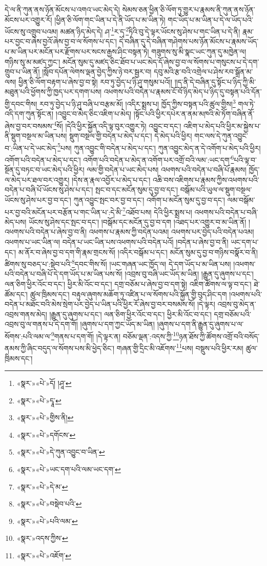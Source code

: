 དེ་ལ་ནི་ཀུན་ནས་ཉོན་མོངས་པ་འགའ་ཡང་མེད་དེ། སེམས་ཅན་ཕྱིན་ཅི་ལོག་ཏུ་གྱུར་པ་རྣམས་ནི་ཀུན་ནས་ཉོན་མོངས་པར་འགྱུར་རོ། །ཕྱིན་ཅི་ལོག་གང་ཡིན་པ་དེ་ནི་ཡོད་པ་མ་ཡིན་ཏེ། གང་ཡོད་པ་མ་ཡིན་པ་དེ་ལ་ཡོད་པའི་ཡོངས་སུ་འགྲུབ་པའམ། མཚན་ཉིད་མེད་དེ། ཤ་\footnote{«སྣར་»«པེ་»དོ། །ཤཱ་}ར་དྭ་\footnote{«སྣར་»«པེ་»དྭཱ་}ཏིའི་བུ་དེ་ལྟར་ཡོངས་སུ་ཤེས་པ་གང་ཡིན་པ་དེ་ནི། རྣམ་པར་བྱང་བ་ཞེས་བྱའོ་ཞེས་བྱ་བ་ལ་སོགས་པ་དང་། དེ་བཞིན་དུ་དེ་བཞིན་གཤེགས་པས་ཉོན་མོངས་པ་རྣམས་ཡོད་པ་མ་ཡིན་པར་མངོན་པར་རྫོགས་པར་སངས་རྒྱས་ཤིང་བསྟན་ཏེ། གཟུགས་སུ་མི་སྣང་ཡང་ཀུན་དུ་མཁྱེན་ལ། གཉིས་སུ་མ་མཛད་ཀྱང་། མངོན་སུམ་དུ་མཛད་ཅིང་ཐོབ་པ་ཡང་མེད་དོ་ཞེས་བྱ་བ་ལ་སོགས་པ་གསུངས་པ་དེ་དག་གྲུབ་པ་ཡིན་ནོ། །སློབ་དཔོན་ལེགས་ལྡན་བྱེད་ཀྱིས་ཉེ་བར་སྦྱར་བ། དབུ་མའི་རྩ་བའི་འགྲེལ་པ་ཤེས་རབ་སྒྲོན་མ་ལས། ཕྱིན་ཅི་ལོག་བརྟག་པ་ཞེས་བྱ་བ་སྟེ། རབ་ཏུ་བྱེད་པ་ཉི་ཤུ་གསུམ་པའོ།། །།ད་ནི་དེ་བཞིན་དུ་སྟོང་པ་ཉིད་ཀྱི་མི་མཐུན་པའི་ཕྱོགས་ཀྱི་ཁྱད་པར་དགག་པས། འཕགས་པའི་བདེན་པ་རྣམས་ངོ་བོ་ཉིད་མེད་པ་ཉིད་དུ་བསྟན་པའི་དོན་གྱི་དབང་གིས། རབ་ཏུ་བྱེད་པ་ཉི་ཤུ་བཞི་པ་བརྩམ་མོ། །འདིར་སྨྲས་པ། ཁྱོད་ཀྱིས་བསྟན་པའི་ཚུལ་གྱིས།\footnote{«སྣར་»«པེ་»གྱིས་ནི།} གལ་ཏེ་འདི་དག་ཀུན་སྟོང་ན། །འབྱུང་བ་མེད་ཅིང་འཇིག་པ་མེད། །སྟོང་པའི་ཕྱིར་དཔེར་ན་ནམ་མཁའི་མེ་ཏོག་བཞིན་ནོ་ཞེས་བྱ་བར་བསམས་\footnote{«སྣར་»«པེ་»དགོངས་}སོ། །དེའི་ཕྱིར་སྐྱོན་འདི་ལྟ་བུར་འགྱུར་ཏེ། འབྱུང་བ་དང་། འཇིག་པ་མེད་པའི་ཕྱིར་མ་སྐྱེས་པ་ནི་སྡུག་བསྔལ་མ་ཡིན་པས། སྡུག་བསྔལ་གྱི་བདེན་པ་མེད་པ་དང་། དེ་མེད་པའི་ཕྱིར། གང་ལས་དེ་ཀུན་འབྱུང་བ་:ཡིན་པ་དེ་ཡང་མེད་\footnote{«སྣར་»«པེ་»དེ་ཀུན་འབྱུང་བ་ཡིན་}པས། ཀུན་འབྱུང་གི་བདེན་པ་མེད་པ་དང་། ཀུན་འབྱུང་མེད་ན་དེ་འགོག་པ་མེད་པའི་ཕྱིར། འགོག་པའི་བདེན་པ་མེད་པ་དང་། འགོག་པའི་བདེན་པ་མེད་ན་འགོག་པར་འགྲོ་བའི་ལམ་:ཡང་དག་\footnote{«སྣར་»«པེ་»ཡང་དག་པའི་ལམ་ཡང་དག་}པའི་ལྟ་བ་སྔོན་དུ་བཏང་བ་ཡང་མེད་པའི་ཕྱིར། ལམ་གྱི་བདེན་པ་ཡང་མེད་པས། འཕགས་པའི་བདེན་པ་བཞི་པོ་རྣམས། ཁྱོད་ལ་མེད་པར་ཐལ་བར་འགྱུར། །དེས་ན་རྣལ་འབྱོར་པ་མེད་པ་དང་། འཆི་བས་འཇིགས་པ་རྣམས་ཀྱིས་འཕགས་པའི་བདེན་པ་བཞི་པོ་ཡོངས་སུ་ཤེས་པ་དང་། སྤང་བ་དང་མངོན་སུམ་དུ་བྱ་བ་དང་། བསྒོམ་པའི་ཡུལ་ལ་སྡུག་བསྔལ་ཡོངས་སུ་ཤེས་པར་བྱ་བ་དང་། ཀུན་འབྱུང་སྤང་བར་བྱ་བ་དང་། འགོག་པ་མངོན་སུམ་དུ་བྱ་བ་དང་། ལམ་བསྒོམ་པར་བྱ་བའི་མངོན་པར་བརྩོན་པ་གང་ཡིན་པ་:དེ་མི་\footnote{«སྣར་»«པེ་»དེ་མ་}འཐོབ་པས། དེའི་ཕྱིར་སྨྲས་པ། འཕགས་པའི་བདེན་པ་བཞི་མེད་པས། ཡོངས་སུ་ཤེས་དང་སྤང་བ་དང་། །བསྒོམ་དང་མངོན་དུ་བྱ་བ་དག །འཐད་པར་འགྱུར་བ་མ་ཡིན་ནོ། །འཕགས་པའི་བདེན་པ་ཞེས་བྱ་བ་ནི། འཕགས་པ་རྣམས་ཀྱི་བདེན་པའམ། འཕགས་པར་བྱེད་པའི་བདེན་པའམ། འཕགས་པ་ཡང་ཡིན་ལ། བདེན་པ་ཡང་ཡིན་པས་འཕགས་པའི་བདེན་པའོ། །བདེན་པ་ཞེས་བྱ་བ་ནི། ཡང་དག་པ་དང་། མ་ནོར་བ་ཞེས་བྱ་བ་དག་གི་རྣམ་གྲངས་སོ། །འདིར་བསྒོམ་པ་དང་། མངོན་སུམ་དུ་བྱ་བ་གཉིས་བསྣོར་བ་ནི། ཚིགས་སུ་བཅད་པ་:སྡེབ་པའི་\footnote{«སྣར་»«པེ་»བསྡེབ་པའི་}དབང་གིས་སོ། །ཡང་གཞན་ཡང་ཁྱོད་ལ། དེ་དག་ཡོད་པ་མ་ཡིན་པས། །འཕགས་པའི་བདེན་པ་བཞི་པོ་དེ་དག་ཡོད་པ་མ་ཡིན་པས་སོ། །འབྲས་བུ་བཞི་ཡང་ཡོད་མ་ཡིན། །རྒྱུན་དུ་ཞུགས་པ་དང་། ལན་ཅིག་ཕྱིར་འོང་བ་དང་། ཕྱིར་མི་འོང་བ་དང་། དགྲ་བཅོམ་པ་ཞེས་བྱ་བ་དག་སྟེ། འཇིག་ཚོགས་ལ་ལྟ་བ་དང་། ཐེ་ཚོམ་དང་། ཚུལ་ཁྲིམས་དང་། བརྟུལ་ཞུགས་མཆོག་ཏུ་འཛིན་པ་ལ་སོགས་པའི་སྐྱོན་གྱི་བུད་ཤིང་དག །འཕགས་པའི་བདེན་པ་མཐོང་བའི་མེས་སྲེག་པར་བྱེད་པ་ཡིན་པའི་ཕྱིར་རོ་ཞེས་བྱ་བར་བསམས་སོ། །དེ་ལྟར། འབྲས་བུ་མེད་ན་འབྲས་གནས་མེད། །རྒྱུན་དུ་ཞུགས་པ་དང་། ལན་ཅིག་ཕྱིར་འོང་བ་དང་། ཕྱིར་མི་འོང་བ་དང་། དགྲ་བཅོམ་པའི་འབྲས་བུ་ལ་གནས་པ་དེ་དག་གོ། །ཞུགས་པ་དག་ཀྱང་ཡོད་མ་ཡིན། །ཞུགས་པ་དག་ནི་རྒྱུན་དུ་ཞུགས་པ་ལ་སོགས་:པའི་ལམ་ལ་\footnote{«སྣར་»«པེ་»པའི་ལམ་}གནས་པ་དག་གོ། །དེ་ལྟར་ན། བཅོམ་ལྡན་:འདས་ཀྱི་\footnote{«སྣར་»འདས་ཀྱིས་}ཉན་ཐོས་ཀྱི་ཚོགས་འགྲོ་བའི་བསོད་ནམས་ཀྱི་ཞིང་བདུད་ལ་སོགས་པས་མི་ཕྱེད་ཅིང་། གཞན་གྱི་དྲིང་མི་འཇོགས་\footnote{«སྣར་»«པེ་»འཇོག་}པས། བསྡུས་པའི་ཕྱིར་རམ། ཚུལ་ཁྲིམས་དང་། 